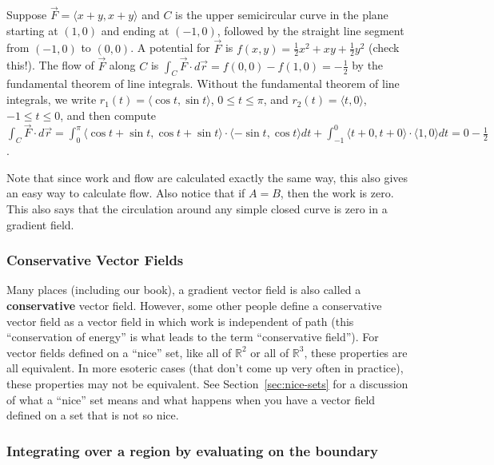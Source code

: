 \begin{example}
Suppose $\vec F = \langle x+y,x+y\rangle$ and $C$ is the upper
semicircular curve in the plane starting at $(1,0)$ and ending at
$(-1,0)$, followed by the straight line segment from $(-1,0)$ to
$(0,0)$. A potential for $\vec F$ is $f(x,y) =
\frac{1}{2}x^2+xy+\frac12 y^2$ (check this!).  The flow of $\vec F$
along $C$ is $\int_C \vec F \cdot d\vec r = f(0,0)-f(1,0) =-\frac{1}{2} $ by
the fundamental theorem of line integrals.  Without the fundamental
theorem of line integrals, we write $r_1(t) = \langle\cos t,\sin t\rangle$, $0\leq t\leq
\pi$, and $r_2(t) = \langle t,0\rangle$, $-1\leq t\leq 0$, and then compute $\int_C \vec F \cdot
d\vec r = \int_0^\pi \langle\cos t+\sin t,\cos t+\sin t\rangle\cdot\langle-\sin t, \cos t\rangle dt
+\int_{-1}^0\langle t+0,t+0\rangle\cdot\langle1,0\rangle dt = 0-\frac12$.
\end{example}


Note that since work and flow are calculated exactly the same way,
this also gives an easy way to calculate flow.  Also notice that if
$A=B$, then the work is zero.  This also says that the circulation
around any simple closed curve is zero in a gradient field.

\subsubsection{Conservative Vector Fields}

Many places (including our book), a gradient vector field is also
called a \textbf{conservative} vector field.  However, some other
people define a conservative vector field as a vector field in which
work is independent of path (this ``conservation of energy'' is what
leads to the term ``conservative field'').  For vector fields defined
on a ``nice'' set, like all of $\mathbb{R}^2$ or all of
$\mathbb{R}^3$, these properties are all equivalent.  In more esoteric
cases (that don't come up very often in practice), these properties
may not be equivalent.  See Section~\ref{sec:nice-sets} for a
discussion of what a ``nice'' set means and what happens when you have
a vector field defined on a set that is not so nice.


\subsubsection{Integrating over a region by evaluating on the
  boundary}

